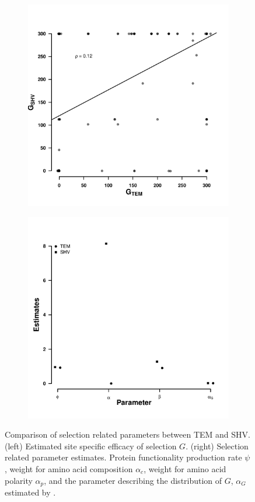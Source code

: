 \documentclass[12pt]{article}
\begin{document}
\begin{figure}[h]
    \centering
    \begin{subfigure}
        \centering
        \includegraphics[width=.45\textwidth]{img/g_shift_lac.pdf}
    \end{subfigure}
    \begin{subfigure}
        \centering
        \includegraphics[width=.45\textwidth]{img/TEM_SHV_2016_par_comp.pdf}
    \end{subfigure}
    \caption{Comparison of selection related parameters between TEM and SHV. 
    (left) Estimated site specific efficacy of selection $G$. 
    (right) Selection related parameter estimates. 
    Protein functionality production rate $\psi$, \PC weight for amino acid composition $\alpha_c$, \PC weight for amino acid polarity $\alpha_p$, and the parameter describing the distribution of $G$, $\alpha_G$ estimated by \selac.}
    \label{fig:tem_shv_param_comp}
\end{figure}
\end{document}
